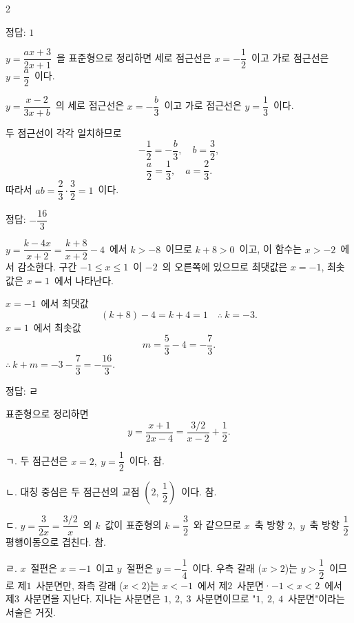 \documentclass[10pt,fleqn]{article}
\begin{document}
\dmsoltitlefirsttrue
\begin{multicols*}{2}

\begin{dmanswerbox}
정답: $1$
\end{dmanswerbox}

$y=\dfrac{ax+3}{2x+1}$\ 을 표준형으로 정리하면 세로 점근선은 $x=-\dfrac{1}{2}$\ 이고 가로 점근선은 $y=\dfrac{a}{2}$\ 이다.

$y=\dfrac{x-2}{3x+b}$\ 의 세로 점근선은 $x=-\dfrac{b}{3}$\ 이고 가로 점근선은 $y=\dfrac{1}{3}$\ 이다.

두 점근선이 각각 일치하므로
\[ -\dfrac{1}{2}=-\dfrac{b}{3},\quad b=\dfrac{3}{2}, \]
\[ \dfrac{a}{2}=\dfrac{1}{3},\quad a=\dfrac{2}{3}. \]
따라서 $ab=\dfrac{2}{3}\cdot\dfrac{3}{2}=1$\ 이다.

\begin{dmanswerbox}
정답: $-\dfrac{16}{3}$
\end{dmanswerbox}

$y=\dfrac{k-4x}{x+2}=\dfrac{k+8}{x+2}-4$\ 에서 $k>-8$\ 이므로 $k+8>0$\ 이고, 이 함수는 $x>-2$\ 에서 감소한다. 구간 $-1\le x\le 1$\ 이 $-2$\ 의 오른쪽에 있으므로 최댓값은 $x=-1$, 최솟값은 $x=1$\ 에서 나타난다.

$x=-1$\ 에서 최댓값
\[ (k+8)-4=k+4=1\quad\therefore\ k=-3. \]
$x=1$\ 에서 최솟값
\[ m=\dfrac{5}{3}-4=-\dfrac{7}{3}. \]
$\therefore\ k+m=-3-\dfrac{7}{3}=-\dfrac{16}{3}$.

\begin{dmanswerbox}
정답: ㄹ
\end{dmanswerbox}

표준형으로 정리하면
\[ y=\dfrac{x+1}{2x-4}=\dfrac{3/2}{x-2}+\dfrac{1}{2}. \]

\medskip
ㄱ. 두 점근선은 $x=2,\ y=\dfrac{1}{2}$\ 이다. 참.

\smallskip
ㄴ. 대칭 중심은 두 점근선의 교점 $\left(2,\, \dfrac{1}{2}\right)$\ 이다. 참.

\smallskip
ㄷ. $y=\dfrac{3}{2x}=\dfrac{3/2}{x}$\ 의 $k$\ 값이 표준형의 $k=\dfrac{3}{2}$\ 와 같으므로 $x$\ 축 방향 $2$,\ $y$\ 축 방향 $\dfrac{1}{2}$ 평행이동으로 겹친다. 참.

\smallskip
ㄹ. $x$\ 절편은 $x=-1$\ 이고 $y$\ 절편은 $y=-\dfrac{1}{4}$\ 이다. 우측 갈래 ($x>2$)는 $y>\dfrac{1}{2}$\ 이므로 제$1$\ 사분면만, 좌측 갈래 ($x<2$)는 $x<-1$\ 에서 제$2$\ 사분면·$-1<x<2$\ 에서 제$3$\ 사분면을 지난다. 지나는 사분면은 $1,\ 2,\ 3$\ 사분면이므로 "$1,\ 2,\ 4$\ 사분면"이라는 서술은 거짓.


\end{multicols*}
\end{document}
